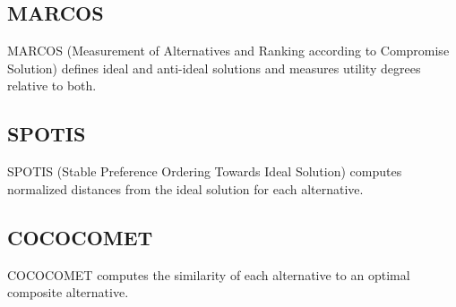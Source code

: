 \documentclass[12pt,a4paper,oneside]{report}
\begin{document}
\subsection{MARCOS}

MARCOS (Measurement of Alternatives and Ranking according to Compromise Solution) defines ideal and anti-ideal solutions and measures utility degrees relative to both.

\subsection{SPOTIS}

SPOTIS (Stable Preference Ordering Towards Ideal Solution) computes normalized distances from the ideal solution for each alternative.

\subsection{COCOCOMET}

COCOCOMET computes the similarity of each alternative to an optimal composite alternative.
\end{document}
